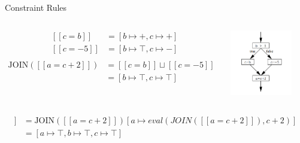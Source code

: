 \documentclass[aspectratio=169,xcolor=dvipsnames]{beamer}
\begin{document}
\begin{frame}[fragile]{Constraint Rules}
	\begin{columns}[c] %


		\begin{align*}
			 & [[c=b]]  & = [b \mapsto +, c \mapsto +]    \\
			 & [[c=-5]] & = [b \mapsto \top, c \mapsto -] \\
		\end{align*}
		\begin{align*}
			\text{JOIN}([[a=c+2]]) & = [[c=b]] \sqcup [[c=-5]]          \\
			                       & = [b \mapsto \top, c \mapsto \top]
		\end{align*}

		\includegraphics[width=0.8\textwidth]{img/2.png}
	\end{columns}

	\begin{align*}
		[[a=c+2]] & = \text{JOIN}([[a=c+2]])[a \mapsto eval(JOIN([[a=c+2]]), c+2)] \\
		          & = [a \mapsto \top, b \mapsto \top, c \mapsto \top]
	\end{align*}
\end{frame}
\end{document}
